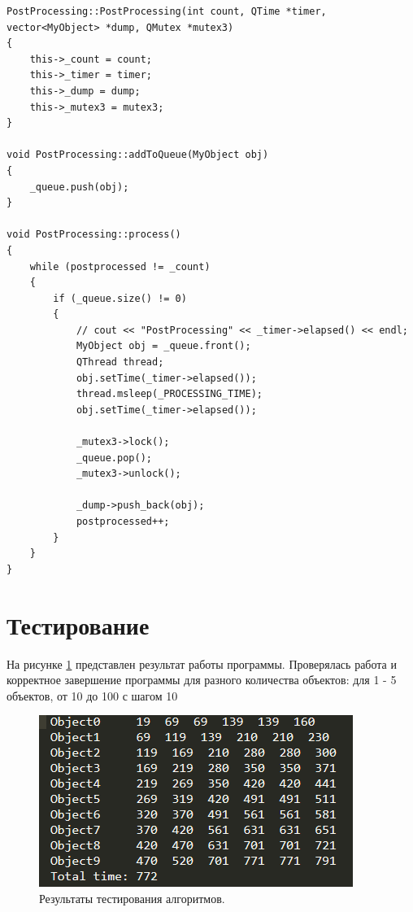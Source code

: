 \begin{lstlisting}[label=lst:post, caption=Реализация класса PostProcessing]
PostProcessing::PostProcessing(int count, QTime *timer, vector<MyObject> *dump, QMutex *mutex3)
{
    this->_count = count;
    this->_timer = timer;
    this->_dump = dump;
    this->_mutex3 = mutex3;
}

void PostProcessing::addToQueue(MyObject obj)
{
    _queue.push(obj);
}

void PostProcessing::process()
{
    while (postprocessed != _count)
    {
        if (_queue.size() != 0)
        {
            // cout << "PostProcessing" << _timer->elapsed() << endl;
            MyObject obj = _queue.front();
            QThread thread;
            obj.setTime(_timer->elapsed());
            thread.msleep(_PROCESSING_TIME);
            obj.setTime(_timer->elapsed());

            _mutex3->lock();
            _queue.pop();
            _mutex3->unlock();

            _dump->push_back(obj);
            postprocessed++;
        }
    }
}
\end{lstlisting}
        
    \section{Тестирование}
        На рисунке \ref{png:testing:result} представлен результат работы программы.
        Проверялась работа и корректное завершение программы для разного количества объектов: для 1 - 5 объектов, от 10 до 100 с шагом 10

        \begin{figure}[h!]
            \centering
            \includegraphics[scale=0.9]{pr.png}
            \caption{Результаты тестирования алгоритмов.}
            \label{png:testing:result}
        \end{figure}
\newpage